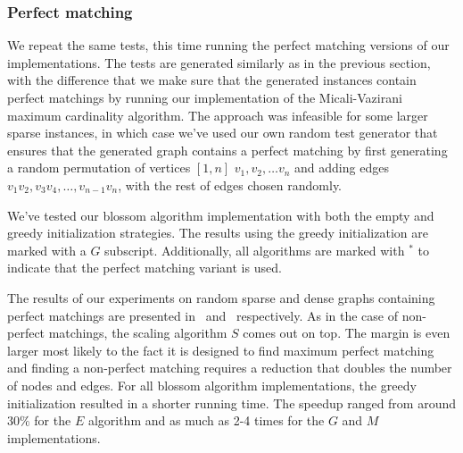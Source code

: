 \subsubsection*{Perfect matching}

We repeat the same tests, this time running the perfect matching versions of our implementations. The tests are generated similarly as in the previous section, with the difference that we make sure that the generated instances contain perfect matchings by running our implementation of the Micali-Vazirani maximum cardinality algorithm. The approach was infeasible for some larger sparse instances, in which case we've used our own random test generator that ensures that the generated graph contains a perfect matching by first generating a random permutation of vertices $[1, n]$ $v_1, v_2, \dots v_n$ and adding edges $v_1v_2, v_3v_4, \dots, v_{n-1}v_n$, with the rest of edges chosen randomly.

We've tested our blossom algorithm implementation with both the empty and greedy initialization strategies. The results using the greedy initialization are marked with a $G$ subscript. Additionally, all algorithms are marked with $^*$ to indicate that the perfect matching variant is used.

The results of our experiments on random sparse and dense graphs containing perfect matchings are presented in~ and~ respectively. As in the case of non-perfect matchings, the scaling algorithm $S$ comes out on top. The margin is even larger most likely to the fact it is designed to find maximum perfect matching and finding a non-perfect matching requires a reduction that doubles the number of nodes and edges. For all blossom algorithm implementations, the greedy initialization resulted in a shorter running time. The speedup ranged from around $30\%$ for the $E$ algorithm and as much as 2-4 times for the $G$ and $M$ implementations.

